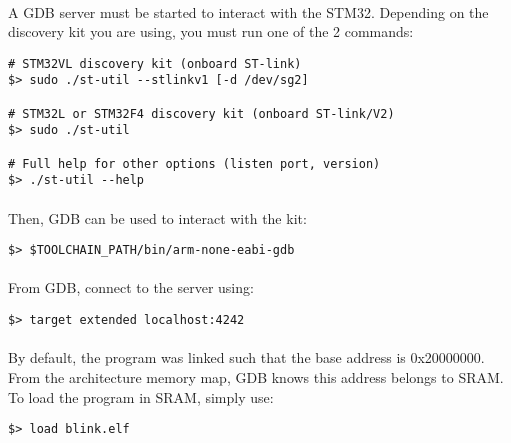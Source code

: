 \documentclass[a4paper, 11pt]{article}
\begin{document}
\paragraph{}
A GDB server must be started to interact with the STM32. Depending on the discovery kit you
are using, you must run one of the 2 commands:\\
\begin{small}
\begin{lstlisting}[frame=tb]
# STM32VL discovery kit (onboard ST-link)
$> sudo ./st-util --stlinkv1 [-d /dev/sg2]

# STM32L or STM32F4 discovery kit (onboard ST-link/V2)
$> sudo ./st-util 

# Full help for other options (listen port, version)
$> ./st-util --help
\end{lstlisting}
\end{small}

\paragraph{}
Then, GDB can be used to interact with the kit:\\
\begin{small}
\begin{lstlisting}[frame=tb]
$> $TOOLCHAIN_PATH/bin/arm-none-eabi-gdb
\end{lstlisting}
\end{small}

\paragraph{}
From GDB, connect to the server using:\\
\begin{small}
\begin{lstlisting}[frame=tb]
$> target extended localhost:4242
\end{lstlisting}
\end{small}

\paragraph{}
By default, the program was linked such that the base address is 0x20000000. From the architecture
memory map, GDB knows this address belongs to SRAM. To load the program in SRAM, simply use:\\
\begin{small}
\begin{lstlisting}[frame=tb]
$> load blink.elf
\end{lstlisting}
\end{small}
\end{document}
